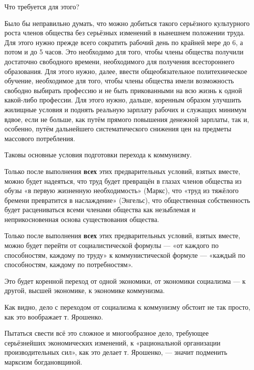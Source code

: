 \documentclass[12pt, a4paper, openany]{book}
\begin{document}
Что требуется для этого?

Было бы неправильно думать, что можно добиться такого серьёзного культурного роста членов общества без серьёзных изменений в нынешнем положении труда. Для этого нужно прежде всего сократить рабочий день по крайней мере до 6, а потом и до 5 часов. Это необходимо для того, чтобы члены общества получили достаточно свободного времени, необходимого для получения всестороннего образования. Для этого нужно, далее, ввести общеобязательное политехническое обучение, необходимое для того, чтобы члены общества имели возможность свободно выбирать профессию и не быть прикованными на всю жизнь к одной какой-либо профессии. Для этого нужно, дальше, коренным образом улучшить жилищные условия и поднять реальную зарплату рабочих и служащих минимум вдвое, если не больше, как путём прямого повышения денежной зарплаты, так и, особенно, путём дальнейшего систематического снижения цен на предметы массового потребления.

Таковы основные условия подготовки перехода к коммунизму.

Только после выполнения \textbf{всех} этих предварительных условий, взятых вместе, можно будет надеяться, что труд будет превращён в глазах членов общества из обузы «в первую жизненную необходимость» (Маркс), что «труд из тяжёлого бремени превратится в наслаждение» (Энгельс), что общественная собственность будет расцениваться всеми членами общества как незыблемая и неприкосновенная основа существования общества.

Только после выполнения \textbf{всех} этих предварительных условий, взятых вместе, можно будет перейти от социалистической формулы — «от каждого по способностям, каждому по труду» к коммунистической формуле — «каждый по способностям, каждому по потребностям».

Это будет коренной переход от одной экономики, от экономики социализма — к другой, высшей экономике, к экономике коммунизма.

Как видно, дело с переходом от социализма к коммунизму обстоит не так просто, как это воображает т. Ярошенко.



Пытаться свести всё это сложное и многообразное дело, требующее серьёзнейших экономических изменений, к «рациональной организации производительных сил», как это делает т. Ярошенко, — значит подменить марксизм богдановщиной.



\vspace{0.4cm}
\end{document}

